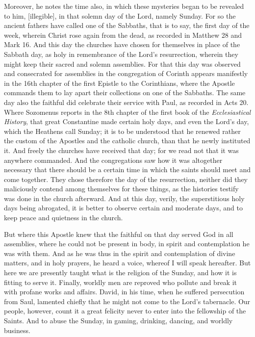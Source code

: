 Moreover, he notes the time also, in which these mysteries began to be revealed to him, [illegible], in that solemn day of the Lord, namely Sunday. For so the ancient fathers have called one of the Sabbaths, that is to say, the first day of the week, wherein Christ rose again from the dead, as recorded in Matthew 28 and Mark 16. And this day the churches have chosen for themselves in place of the Sabbath day, as holy in remembrance of the Lord’s resurrection, wherein they might keep their sacred and solemn assemblies. For that this day was observed and consecrated for assemblies in the congregation of Corinth appears manifestly in the 16th chapter of the first Epistle to the Corinthians, where the Apostle commands them to lay apart their collections on one of the Sabbaths. The same day also the faithful did celebrate their service with Paul, as recorded in Acts 20. Where Sozomenus reports in the 8th chapter of the first book of the \textit{Ecclesiastical History}, that great Constantine made certain holy days, and even the Lord’s day, which the Heathens call Sunday; it is to be understood that he renewed rather the custom of the Apostles and the catholic church, than that he newly instituted it. And freely the churches have received that day; for we read not that it was anywhere commanded. And the congregations saw how it was altogether necessary that there should be a certain time in which the saints should meet and come together. They chose therefore the day of the resurrection, neither did they maliciously contend among themselves for these things, as the histories testify was done in the church afterward. And at this day, verily, the superstitious holy days being abrogated, it is better to observe certain and moderate days, and to keep peace and quietness in the church.

But where this Apostle knew that the faithful on that day served God in all assemblies, where he could not be present in body, in spirit and contemplation he was with them. And as he was thus in the spirit and contemplation of divine matters, and in holy prayers, he heard a voice, whereof I will speak hereafter. But here we are presently taught what is the religion of the Sunday, and how it is fitting to serve it. Finally, worldly men are reproved who pollute and break it with profane works and affairs. David, in his time, when he suffered persecution from Saul, lamented chiefly that he might not come to the Lord’s tabernacle. Our people, however, count it a great felicity never to enter into the fellowship of the Saints. And to abuse the Sunday, in gaming, drinking, dancing, and worldly business.

